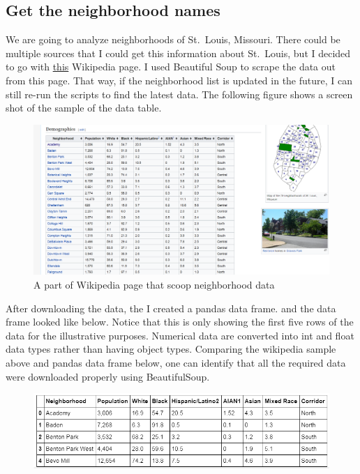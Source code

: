 \documentclass[11pt]{article}
\makeatletter
\def\maxwidth{\ifdim\Gin@nat@width>\linewidth\linewidth
    \else\Gin@nat@width\fi}
\let\Oldincludegraphics\includegraphics
\renewcommand{\includegraphics}[1]{\Oldincludegraphics[width=.95\maxwidth]{#1}}
\makeatother
\begin{document}
\hypertarget{get-the-neighborhood-names}{%
\subsection{Get the neighborhood
names}\label{get-the-neighborhood-names}}

We are going to analyze neighborhoods of St.~Louis, Missouri. There
could be multiple sources that I could get this information about
St.~Louis, but I decided to go with
\href{https://en.wikipedia.org/wiki/List_of_neighborhoods_of_St._Louis}{this}
Wikipedia page. I used Beautiful Soup to scrape the data out
from this page. That way, if the neighborhood list is updated in the
future, I can still re-run the scripts to find the latest data. The following figure shows a screen shot of the sample of the data table.

\begin{figure}[h!]
  \includegraphics{Battle_of_Neighborhood_V2_files/wiki_page.png}
  \caption{A part of Wikipedia page that scoop neighborhood data}
  \label{fig:wiki_page}
\end{figure}

After downloading the data, the I created a pandas data frame. and the data frame looked like below. Notice that this is only showing the first five rows of the data for the  illustrative purposes. Numerical data are converted into int and float data types rather than having object types. Comparing the wikipedia sample above and pandas data frame below, one can identify that all the required data were downloaded properly using BeautifulSoup.


\begin{center}
\begin{figure}[h!]
  \includegraphics{Battle_of_Neighborhood_V2_files/data_read_wiki_table.png}
\end{figure}
\end{center}
\end{document}
